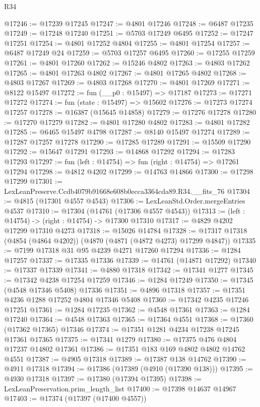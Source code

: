 \begin{lexlean}{R34}
\begin{coremodule}
@17246 := @17239 @17245
@17247 := @4801 @17246
@17248 := @6487 @17235
@17249 := @17248 @17240
@17251 := @5703 @17249 @6495
@17252 := @17247 @17251
@17254 := @4801 @17252 @4804
@17255 := @4801 @17254
@17257 := @6487 @17249 @24
@17259 := @5703 @17257 @6495
@17260 := @17255 @17259
@17261 := @4801 @17260
@17262 := @15246 @4802
@17263 := @4803 @17262
@17265 := @4801 @17263 @4802
@17267 := @4801 @17265 @4802
@17268 := @4803 @17267
@17269 := @4803 @17268
@17270 := @4801 @17269
@17271 := @8122 @15497
@17272 := fun (__p0 : @15497) => @17187
@17273 := @17271 @17272
@17274 := fun (state : @15497) => @15602
@17276 := @17273 @17274 @17257
@17278 := @16387 (@15645 @14858)
@17279 := @17276 @17278
@17280 := @17270 @17279
@17282 := @4801 @17280 @4802
@17283 := @4801 @17282
@17285 := @6465 @15497 @4798
@17287 := @8140 @15497 @17274
@17289 := @17287 @17257 @17278
@17290 := @17285 @17289
@17291 := @15509 @17290
@17292 := @15647 @17291
@17293 := @14868 @17292
@17294 := @17283 @17293
@17297 := fun (left : @14754) => fun (right : @14754) => @17261 @17294
@17298 := @4812 @4202
@17299 := @14763 @14866
@17300 := @17298 @17299
@17301 := LexLeanPreserve.Ccdb4079b91668e608b0ecca3364cda89.R34.__fits_76
@17304 := @4815 (@17301 @4557 @4543)
@17306 := LexLeanStd.Order.mergeEntries @4537
@17310 := @17304 (@14761 (@17306 @4557 @4543))
@17313 := (left : @14754) -> (right : @14754) -> @17300 @17310
@17317 := @4829 @4202 @17299 @17310 @4273
@17318 := @15026 @14784
@17328 := @17317 @17318 (@4854 (@4864 @4202)) (@4870 (@4871 (@4872 @4273) @17299 @4847))
@17335 := @7199 @17318 @31 @95 @4239 @4271 @17260 @17294
@17336 := @1284 @17257
@17337 := @17335 @17336
@17339 := @14761 (@14871 @17292)
@17340 := @17337 @17339
@17341 := @4880 @17318
@17342 := @17341 @1277
@17345 := @17342 @4238 @17254 @17259
@17346 := @1284 @17249
@17350 := @17345 (@4548 @17346 @5408) @17336
@17351 := @4896 @17318
@17357 := @17351 @4236 @1288 @17252 @4804 @17346 @5408
@17360 := @17342 @4235 @17246 @17251
@17361 := @1284 @17235
@17362 := @4548 @17361
@17363 := @1284 @17240
@17364 := @4548 @17363
@17365 := @17364 @4551
@17368 := @17360 (@17362 @17365) @17346
@17374 := @17351 @1281 @4234 @17238 @17245 @17361 @17365
@17375 := @17341 @1279
@17380 := @17375 @476 @4804 @17237 @14802 @17361
@17386 := @17351 @183 @169 @4802 @4802 @14762 @4551
@17387 := @4905 @17318
@17389 := @17387 @138 @14762
@17390 := @4911 @17318
@17394 := @17386 (@17389 (@4910 (@17390 @138)))
@17395 := @4930 @17318
@17397 := @17380 (@17394 @17395)
@17398 := LexLeanPreservation.prim_length_list
@17400 := @17398 @14637 @14967
@17403 := @17374 (@17397 (@17400 @4557))

\end{coremodule}
\end{lexlean}
